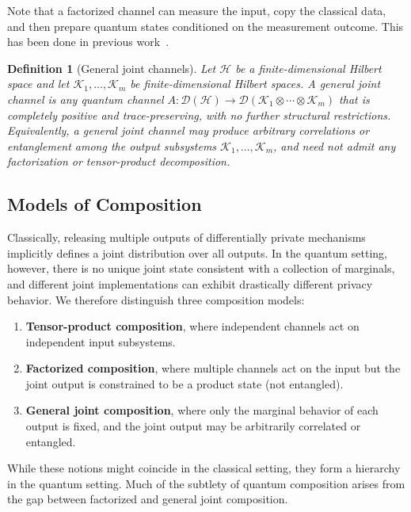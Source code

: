\documentclass[11pt]{article}
\theoremstyle{plain}
\newtheorem{definition}[theo]{Definition}
\theoremstyle{remark}
\begin{document}
Note that a factorized channel can measure the input, copy the classical data, and then prepare
quantum states conditioned on the measurement outcome. This has been done in previous work~\citep{NuradhaGW24}.

\begin{definition}[General joint channels]
Let $\mathcal{H}$ be a finite-dimensional Hilbert space and let
$\mathcal{K}_1,\ldots,\mathcal{K}_m$ be finite-dimensional Hilbert spaces.
A \emph{general joint channel} is any quantum channel
$A:\mathcal{D}(\mathcal{H})\to \mathcal{D}(\mathcal{K}_1\otimes\cdots\otimes\mathcal{K}_m)$
that is completely positive and trace-preserving, with no further structural restrictions.
Equivalently, a general joint channel may produce arbitrary correlations or entanglement among the
output subsystems $\mathcal{K}_1,\ldots,\mathcal{K}_m$, and need not admit any factorization or
tensor-product decomposition.
\end{definition}

\subsection{Models of Composition}
\label{sec:models-of-composition}

Classically, releasing multiple outputs of differentially private mechanisms implicitly defines a joint distribution over all outputs.
In the quantum setting, however, there is no unique joint state consistent with a collection of marginals, and different joint implementations can exhibit drastically different privacy behavior.
We therefore distinguish three composition models:
\begin{enumerate}
  \item \textbf{Tensor-product composition}, where independent channels act on independent input subsystems.
  \item \textbf{Factorized composition}, where multiple channels act on the input but the joint output is constrained to be a product state (not entangled).
  \item \textbf{General joint composition}, where only the marginal behavior of each output is fixed, and the joint output may be arbitrarily correlated or entangled.
\end{enumerate}
While these notions might coincide in the classical setting, they form a hierarchy in the quantum setting.
Much of the subtlety of quantum composition arises from the gap between factorized and general joint composition.
\end{document}
